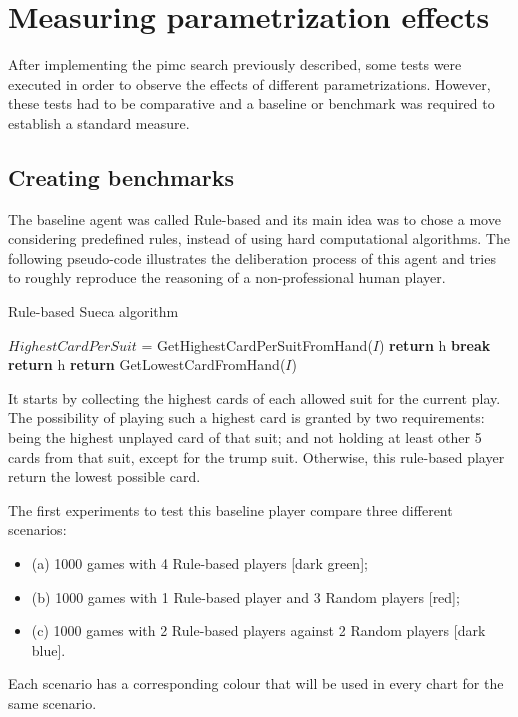 \section{Measuring parametrization effects}
\label{sec:parametrizing}

After implementing the \ac{pimc} search previously described, some tests were executed in order to observe the effects of different parametrizations.
However, these tests had to be comparative and a baseline or benchmark was required to establish a standard measure.


\subsection{Creating benchmarks}
The baseline agent was called Rule-based and its main idea was to chose a move considering predefined rules, instead of using hard computational algorithms.
The following pseudo-code illustrates the deliberation process of this agent and tries to roughly reproduce the reasoning of a non-professional human player.

\begin{algorithm}
	\caption{Rule-based Sueca algorithm}
	\begin{algorithmic}[1]
			\State $HighestCardPerSuit$ = GetHighestCardPerSuitFromHand($I$)
						\State \textbf{return} h
						\State \textbf{break}
						\State \textbf{return} h
					\EndIf
				\EndIf
			\EndFor
			\State \textbf{return} GetLowestCardFromHand($I$)
		\EndProcedure
	\end{algorithmic}
	\label{alg:pimc}
\end{algorithm}

It starts by collecting the highest cards of each allowed suit for the current play.
The possibility of playing such a highest card is granted by two requirements: being the highest unplayed card of that suit; and not holding at least other 5 cards from that suit, except for the trump suit.
Otherwise, this rule-based player return the lowest possible card.

The first experiments to test this baseline player compare three different scenarios:
\begin{itemize}
\item (a) 1000 games with 4 Rule-based players [dark green];
\item (b) 1000 games with 1 Rule-based player and 3 Random players [red];
\item (c) 1000 games with 2 Rule-based players against 2 Random players [dark blue].
\end{itemize}
Each scenario has a corresponding colour that will be used in every chart for the same scenario.

